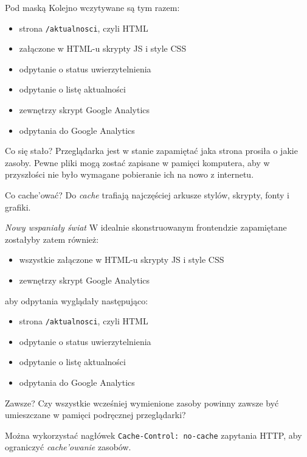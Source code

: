 \begin{frame}{Pod maską}
	Kolejno wczytywane są tym razem:
	\begin{itemize}
		\item strona \texttt{/aktualnosci}, czyli HTML
		\item załączone w HTML-u skrypty JS i style CSS
		\item odpytanie o status uwierzytelnienia
		\item odpytanie o listę aktualności
		\item zewnętrzy skrypt Google Analytics
		\item odpytania do Google Analytics
	\end{itemize}
\end{frame}

\begin{frame}{Co się stało?}
	Przeglądarka jest w stanie zapamiętać jaka strona prosiła o jakie zasoby. Pewne pliki mogą zostać zapisane w pamięci komputera, aby w przyszłości nie było wymagane pobieranie ich na nowo z internetu.
\end{frame}

\begin{frame}{Co cache'ować?}
	Do \emph{cache} trafiają najczęściej arkusze stylów, skrypty, fonty i grafiki.
\end{frame}

\begin{frame}{\emph{Nowy wspaniały świat}}
	W idealnie skonstruowanym frontendzie zapamiętane zostałyby zatem również:
	\begin{itemize}
		\item wszystkie załączone w HTML-u skrypty JS i style CSS
		\item zewnętrzy skrypt Google Analytics
	\end{itemize}
	
	aby odpytania wyglądały następująco:
	\begin{itemize}
		\item strona \texttt{/aktualnosci}, czyli HTML
		\item odpytanie o status uwierzytelnienia
		\item odpytanie o listę aktualności
		\item odpytania do Google Analytics
	\end{itemize}
\end{frame}

\begin{frame}{Zawsze?}
	Czy wszystkie wcześniej wymienione zasoby powinny zawsze być umieszczane w pamięci podręcznej przeglądarki?
	
	Można wykorzystać nagłówek \texttt{Cache-Control: no-cache} zapytania HTTP, aby ograniczyć \emph{cache'owanie} zasobów.
\end{frame}

